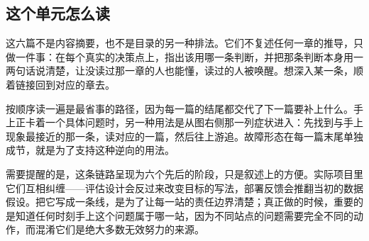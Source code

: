\subsection{这个单元怎么读}

这六篇不是内容摘要，也不是目录的另一种排法。它们不复述任何一章的推导，只做一件事：在每个真实的决策点上，指出该用哪一条判断，并把那条判断本身用一两句话说清楚，让没读过那一章的人也能懂，读过的人被唤醒。想深入某一条，顺着链接回到对应的章去。

按顺序读一遍是最省事的路径，因为每一篇的结尾都交代了下一篇要补上什么。手上正卡着一个具体问题时，另一种用法是从图右侧那一列症状进入：先找到与手上现象最接近的那一条，读对应的一篇，然后往上游追。故障形态在每一篇末尾单独成节，就是为了支持这种逆向的用法。

需要提醒的是，这条链路呈现为六个先后的阶段，只是叙述上的方便。实际项目里它们互相纠缠——评估设计会反过来改变目标的写法，部署反馈会推翻当初的数据假设。把它写成一条线，是为了让每一站的责任边界清楚；真正做的时候，重要的是知道任何时刻手上这个问题属于哪一站，因为不同站点的问题需要完全不同的动作，而混淆它们是绝大多数无效努力的来源。
